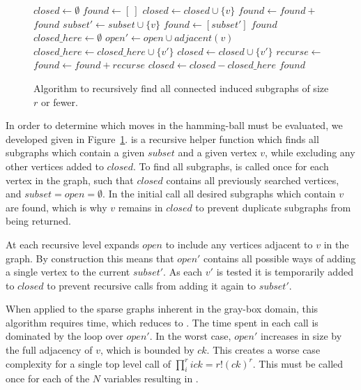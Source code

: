 \begin{figure}
  \begin{algorithmic}[1]
    \State $closed \leftarrow \emptyset$
    \State $found \leftarrow [~]$
      \State $closed \leftarrow closed \cup \{v\}$
      \State $found \leftarrow found + $
    \EndFor
    \State \Return $found$
  \EndProcedure
    \State $subset' \leftarrow subset \cup \{v\}$
    \State $found \leftarrow [subset']$
      \Return $found$
    \EndIf
    \State $closed\_here \leftarrow \emptyset$
    \State $open' \leftarrow open \cup adjacent(v)$
        \State $closed\_here \leftarrow closed\_here \cup \{v'\}$
        \State $closed \leftarrow closed \cup \{v'\}$
        \State $recurse \leftarrow $
        \State $found \leftarrow found + recurse$
    \EndFor
    \State $closed \leftarrow closed - closed\_here$
    \State \Return $found$
  \EndProcedure
\end{algorithmic}
  \caption{Algorithm to recursively find all connected induced subgraphs of size $r$ or fewer.}
  \label{fig-connected-subgraphs}
\end{figure}

In order to determine which moves in the hamming-ball must be evaluated,
we developed  given in Figure~\ref{fig-connected-subgraphs}.
 is a recursive helper function which finds all subgraphs
which contain a given $subset$ and a given vertex $v$, while excluding
any other vertices added to $closed$. To find all subgraphs, 
is called once for each vertex in the graph, such that $closed$ contains
all previously searched vertices, and $subset=open=\emptyset$. In the initial
call all desired subgraphs which contain $v$ are found, which is why $v$ remains
in $closed$ to prevent duplicate subgraphs from being returned.

At each recursive level  expands $open$ to include any vertices
adjacent to $v$ in the graph. By construction this means that $open'$ contains
all possible ways of adding a single vertex to the current $subset'$. As each $v'$
is tested it is temporarily added to $closed$ to prevent recursive calls
from adding it again to $subset'$.

When applied to the sparse graphs inherent in the gray-box domain, this algorithm
requires  time, which reduces to . The time spent
in each call is dominated by the loop over $open'$. In the worst case, $open'$
increases in size by the full adjacency of $v$, which is bounded by $ck$.
This creates a worse case complexity for a single top level call of
$\prod_{i}^{r} ick = r!(ck)^r$. This must be called once for each
of the $N$ variables resulting in .

